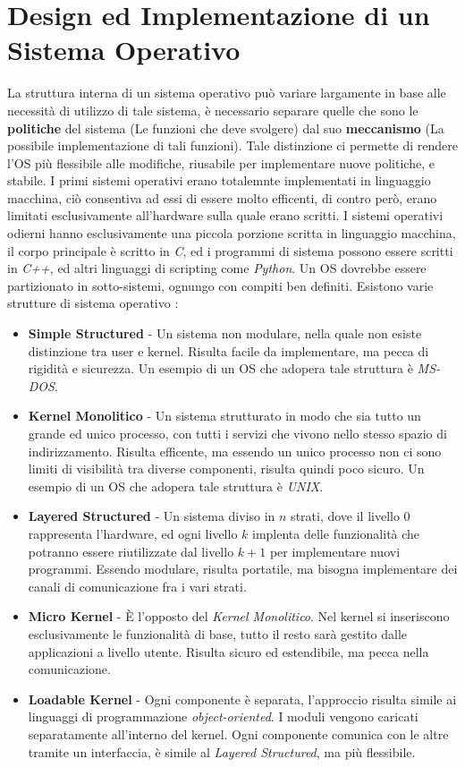 \documentclass[12pt, letterpaper]{article}
\begin{document}
\section{Design ed Implementazione di un Sistema Operativo}
La struttura interna di un sistema operativo può variare largamente in base alle necessità di utilizzo 
di tale sistema, è necessario separare quelle che sono le \textbf{politiche} del sistema 
(Le funzioni che deve svolgere) dal suo \textbf{meccanismo} (La possibile implementazione di tali funzioni).
Tale distinzione ci permette di rendere l'OS più flessibile alle modifiche, riusabile per implementare nuove 
politiche, e stabile. I primi sistemi operativi erano totalemnte implementati in linguaggio macchina, ciò 
consentiva ad essi di essere molto efficenti, di contro però, erano limitati esclusivamente all'hardware sulla 
quale erano scritti. I sistemi operativi odierni hanno esclusivamente una piccola porzione scritta in 
linguaggio macchina, il corpo principale è scritto in \textit{C}, ed i programmi di sistema possono essere scritti 
in \textit{C++}, ed altri linguaggi di scripting come \textit{Python}. Un OS dovrebbe essere partizionato 
in sotto-sistemi, ognungo con compiti ben definiti. Esistono varie strutture di sistema operativo :
\begin{itemize}
    \item \textbf{Simple Structured} - Un sistema non modulare, nella quale non esiste distinzione tra 
    user e kernel. Risulta facile da implementare, ma pecca di rigidità e sicurezza. Un esempio di un OS che 
    adopera tale struttura è \textit{MS-DOS}.
    \item \textbf{Kernel Monolitico} - Un sistema strutturato in modo che sia tutto un grande ed unico processo, con
    tutti i servizi che vivono nello stesso spazio di indirizzamento. Risulta efficente,
    ma essendo un unico processo non ci sono limiti di visibilità tra diverse componenti, risulta 
    quindi poco sicuro. Un esempio di un OS che adopera tale struttura è \textit{UNIX}.
    \item \textbf{Layered Structured} - Un sistema diviso in \(n\) strati, dove il livello 0 rappresenta l'hardware, 
    ed ogni livello \(k\) implenta delle funzionalità che potranno essere riutilizzate dal livello \(k+1\) per 
    implementare nuovi programmi. Essendo modulare, risulta portatile, ma bisogna implementare dei canali di 
    comunicazione fra i vari strati.
    \item \textbf{Micro Kernel} - È l'opposto del \textit{Kernel Monolitico}. Nel kernel si inseriscono 
    esclusivamente le funzionalità di base, tutto il resto sarà gestito dalle applicazioni a livello utente. Risulta
    sicuro ed estendibile, ma pecca nella comunicazione. 
    \item \textbf{Loadable Kernel} - Ogni componente è separata, l'approccio risulta simile ai linguaggi 
    di programmazione \textit{object-oriented}. I moduli vengono caricati separatamente all'interno del 
    kernel. Ogni componente comunica con le altre tramite un interfaccia, è simile al \textit{Layered Structured},
    ma più flessibile.
\end{itemize}
\end{document}
